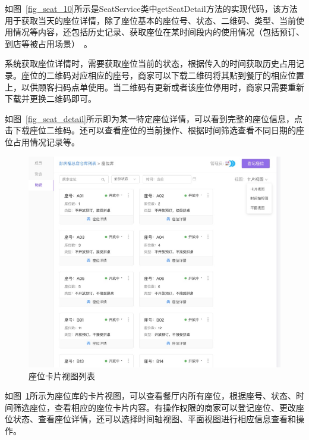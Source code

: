 如图~\ref{fig_seat_10}所示是SeatService类中getSeatDetail方法的实现代码，该方法用于获取当天的座位详情，除了座位基本的座位号、状态、二维码、类型、当前使用情况等内容，还包括历史记录、获取座位在某时间段内的使用情况（包括预订、到店等被占用场景）~\cite{dyh}。

系统获取座位详情时，需要获取座位当前的状态，根据传入的时间获取历史占用记录。座位的二维码对应相应的座号，商家可以下载二维码将其贴到餐厅的相应位置上，以供顾客扫码点单使用。当二维码有更新或者该座位停用时，商家只需要重新下载并更换二维码即可。

如图~\ref{fig_seat_detail}所示即为某一特定座位详情，可以看到完整的座位信息，点击下载座位二维码。还可以查看座位的当前操作、根据时间筛选查看不同日期的座位占用情况记录等。

\begin{figure}[htbp!]
    \centering
    \includegraphics[width=5in]{FIGs/chapter4/seat_list.pdf}
    \caption{座位卡片视图列表}\label{fig_seat_list}
\end{figure}

如图~\ref{fig_seat_list}所示为座位库的卡片视图，可以查看餐厅内所有座位，根据座号、状态、时间筛选座位，查看相应的座位卡片内容。有操作权限的商家可以登记座位、更改座位状态、查看座位详情，还可以选择时间轴视图、平面视图进行相应信息查看和操作。

